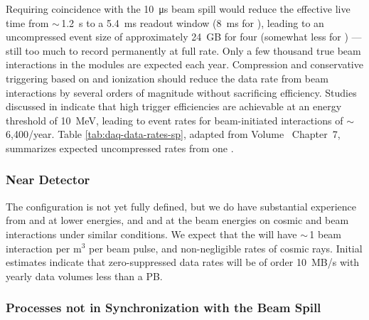  Requiring  coincidence with the \SI{10}{\micro\second}  beam spill would reduce the effective live time from $\sim\,$\SI{1.2}{s} to a \SI{5.4}{ms} readout window (\SI{8}{ms} for ), leading to an uncompressed event size of approximately \SI{24}{GB} for four  (somewhat less for ) --- still too much to record permanently at full rate. 
Only a few thousand true beam interactions in the  modules are expected each year.  Compression and conservative triggering based on  and ionization should reduce the data rate from beam interactions by several orders of magnitude without sacrificing efficiency.  Studies discussed in  \spchdaq{} indicate that high trigger efficiencies are achievable at an energy threshold of \SI{10}{MeV}, leading to event rates for beam-initiated  interactions of $\sim\,$6,400/year.
Table \ref{tab:daq-data-rates-sp}, adapted from Volume~\volnumbersp{} Chapter~7, 
 summarizes expected uncompressed rates from one . 

\subsubsection{Near Detector} 
\label{sec:exec-comp-dt-nd}

The  configuration is not yet fully defined,  but we do have substantial experience from  and   at lower energies, and   and  at the   beam energies on cosmic and beam interactions under similar conditions.  We expect that the   will have $\sim\,$1 beam interaction per m$^3$ per beam pulse, and non-negligible rates of cosmic rays. Initial estimates indicate that zero-suppressed data rates will be of order \SI{10}{MB/s} with yearly data volumes less than a PB.  

\subsubsection{Processes not in Synchronization with the Beam Spill} 
\label{sec:exec-comp-dt-psbs}


